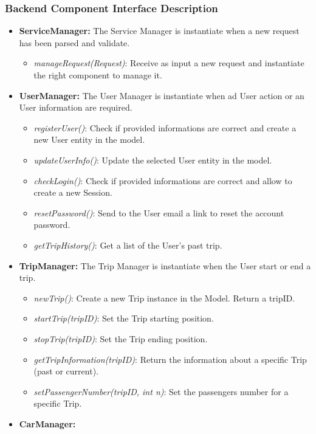 \subsubsection{Backend Component Interface Description}
\begin{itemize}
	\item{\textbf{ServiceManager:}
		The Service Manager is instantiate when a new request has been parsed and validate.
			\begin{itemize}
				\item \textit{manageRequest(Request)}: Receive as input a new request and instantiate the right component to manage it.
			\end{itemize}
		}
	\item{\textbf{UserManager:}
	The User Manager is instantiate when ad User action or an User information are required.
	\begin{itemize}
		\item \textit{registerUser()}: Check if provided informations are correct and create a new User entity in the model.		
		\item \textit{updateUserInfo()}: Update the selected User entity in the model.
		\item \textit{checkLogin()}: Check if provided informations are correct and allow to create a new Session.
		\item \textit{resetPassword()}: Send to the User email a link to reset the account password.
		\item \textit{getTripHistory()}: Get a list of the User's past trip.
	\end{itemize}
}
	\item{\textbf{TripManager:}
	The Trip Manager is instantiate when the User start or end a trip.
	\begin{itemize}
		\item \textit{newTrip()}: Create a new Trip instance in the Model. Return a tripID.
		\item \textit{startTrip(tripID)}: Set the Trip starting position.
		\item \textit{stopTrip(tripID)}: Set the Trip ending position.
		\item \textit{getTripInformation(tripID)}: Return the information about a specific Trip (past or current).
		\item \textit{setPassengerNumber(tripID, int n)}: Set the passengers number for a specific Trip.
	\end{itemize}
}
	\item{\textbf{CarManager:}
}
\end{itemize}
